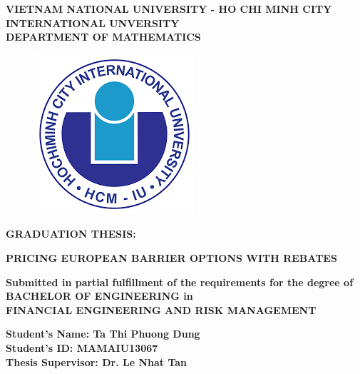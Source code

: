 \documentclass[12pt,a4paper,left=2cm,right=2cm,oneside,titlepage]{report}
\numberwithin{equation}{section}
\begin{document}
	\thispagestyle{empty}
	
	\begin{center}
		\fontsize{12pt}{18pt}\selectfont \textbf{VIETNAM NATIONAL UNIVERSITY - HO CHI MINH CITY\\
			INTERNATIONAL UNVERSITY\\
			DEPARTMENT OF MATHEMATICS} \vspace{0.8cm}
		
		\begin{figure}[htp]
			\begin{center}
				\includegraphics[scale=.6]{logo}
			\end{center}
		\end{figure}	
		\begin{center}
			\fontsize{12pt}{18pt}\selectfont \textbf{GRADUATION THESIS:} \\ \vspace{36pt}
			
			\fontsize{14pt}{16pt}\selectfont \textbf{PRICING EUROPEAN BARRIER OPTIONS WITH REBATES} \\ \vspace{2pt}
			
			\fontsize{12pt}{18pt}\selectfont \textbf{Submitted in partial fulfillment of the requirements for the degree of \\
				BACHELOR OF ENGINEERING in\\ 
				FINANCIAL ENGINEERING AND RISK MANAGEMENT} \\ \vspace{18pt}
			
			\fontsize{12pt}{18pt}\selectfont \textbf{Student's Name:	Ta Thi Phuong Dung\\
				Student's ID:	MAMAIU13067\\
				Thesis Supervisor:	Dr. Le Nhat Tan}
			
		\end{center}
	\end{center}
	
\end{document}
